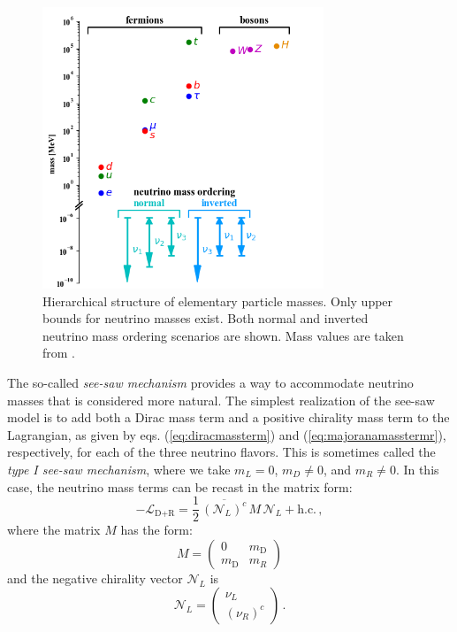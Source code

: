 \begin{figure}[t!b!]
\begin{center}
\includegraphics[width=0.75\textwidth]{img/masses.png}
\end{center}
\caption{ \label{fig:particlemasses}Hierarchical structure of elementary particle masses. Only upper bounds for neutrino masses exist. Both normal and inverted neutrino mass ordering scenarios are shown. Mass values are taken from \cite{ParticleDataGroup:2022pth}.}
\end{figure}

%
\indent The so-called \emph{see-saw mechanism} provides a way to accommodate
 neutrino masses that is considered more natural. The simplest realization of the see-saw model is to add both a Dirac mass term and a positive chirality mass term to the Lagrangian, as given by eqs. (\ref{eq:diracmassterm}) and (\ref{eq:majoranamasstermr}), respectively, for each of the three neutrino flavors. This is sometimes called the \emph{type I see-saw mechanism}, where we take $m_L=0$, $m_D\neq 0$, and $m_R\neq 0$. In this case, the neutrino mass terms can be recast in the matrix form:
\begin{equation}
-\mathcal{L}_{\text{D+R}}
=
\frac{1}{2} \,
\overline{(\mathcal{N}_L)^c} \, M \, \mathcal{N}_L
+
\text{h.c.}
\,,
\label{eq:seesawmatrixform}
\end{equation}
\noindent where the matrix $M$ has the form:
\begin{equation}
M
=
\begin{pmatrix}
0 & m_{\text{D}}
\\
m_{\text{D}} & m_R
\end{pmatrix}
\end{equation}
\noindent and the negative chirality vector $\mathcal{N}_L$ is
\begin{equation}
\mathcal{N}_L
=
\begin{pmatrix}
\nu_L
\\
(\nu_R)^c
\end{pmatrix}
\,.
\label{eq:typeIseesaw_1family}
\end{equation}

